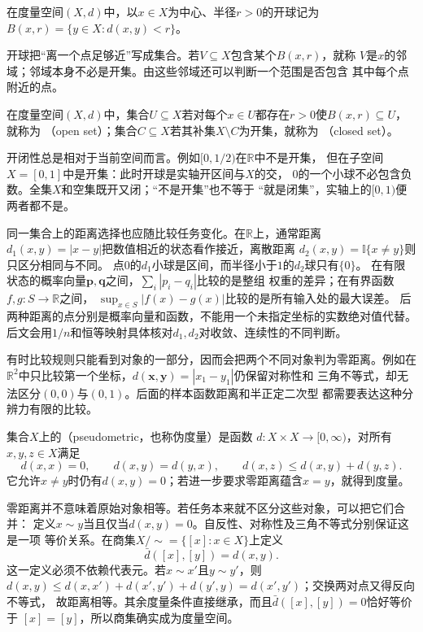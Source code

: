 \begin{definition}[开球]
\label{def:analysis-open-ball}
在度量空间$(X,d)$中，以$x\in X$为中心、半径$r>0$的开球记为
$B(x,r)=\{y\in X:d(x,y)<r\}$。
\end{definition}

开球把“离一个点足够近”写成集合。若$V\subseteq X$包含某个$B(x,r)$，就称
$V$是$x$的邻域；邻域本身不必是开集。由这些邻域还可以判断一个范围是否包含
其中每个点附近的点。

\begin{definition}[开集与闭集]
\label{def:analysis-open-closed-sets}
在度量空间$(X,d)$中，集合$U\subseteq X$若对每个$x\in U$都存在$r>0$使$B(x,r)\subseteq U$，就称为
（open set）；集合$C\subseteq X$若其补集$X\setminus C$为开集，就称为
（closed set）。
\end{definition}

开闭性总是相对于当前空间而言。例如$[0,1/2)$在$\mathbb R$中不是开集，
但在子空间$X=[0,1]$中是开集：此时开球是实轴开区间与$X$的交，
$0$的一个小球不必包含负数。全集$X$和空集既开又闭；“不是开集”也不等于
“就是闭集”，实轴上的$[0,1)$便两者都不是。

同一集合上的距离选择也应随比较任务变化。在$\mathbb R$上，通常距离
$d_1(x,y)=|x-y|$把数值相近的状态看作接近，离散距离
$d_2(x,y)=\mathbb I\{x\neq y\}$则只区分相同与不同。
点$0$的$d_1$小球是区间，而半径小于$1$的$d_2$球只有$\{0\}$。
在有限状态的概率向量$\bm p,\bm q$之间，$\sum_i|p_i-q_i|$比较的是整组
权重的差异；在有界函数$f,g:S\to\mathbb R$之间，
$\sup_{x\in S}|f(x)-g(x)|$比较的是所有输入处的最大误差。
后两种距离的点分别是概率向量和函数，不能用一个未指定坐标的实数绝对值代替。
后文会用$1/n$和恒等映射具体核对$d_1,d_2$对收敛、连续性的不同判断。

有时比较规则只能看到对象的一部分，因而会把两个不同对象判为零距离。例如在
$\mathbb R^2$中只比较第一个坐标，$d(\bm x,\bm y)=|x_1-y_1|$仍保留对称性和
三角不等式，却无法区分$(0,0)$与$(0,1)$。后面的样本函数距离和半正定二次型
都需要表达这种分辨力有限的比较。
\begin{definition}[伪距离]
\label{def:analysis-pseudometric}
集合$X$上的（pseudometric，也称伪度量）是函数
$d:X\times X\to[0,\infty)$，对所有$x,y,z\in X$满足
\[
 d(x,x)=0,\qquad d(x,y)=d(y,x),\qquad d(x,z)\leq d(x,y)+d(y,z).
\]
它允许$x\neq y$时仍有$d(x,y)=0$；若进一步要求零距离蕴含$x=y$，就得到度量。
\end{definition}
零距离并不意味着原始对象相等。若任务本来就不区分这些对象，可以把它们合并：
定义$x\sim y$当且仅当$d(x,y)=0$。自反性、对称性及三角不等式分别保证这是一项
等价关系。在商集$X/{\sim}=\{[x]:x\in X\}$上定义
\begin{equation}
 \bar d([x],[y])=d(x,y).
\label{eq:analysis-quotient-metric}
\end{equation}
这一定义必须不依赖代表元。若$x\sim x'$且$y\sim y'$，则
$d(x,y)\leq d(x,x')+d(x',y')+d(y',y)=d(x',y')$；交换两对点又得反向不等式，
故距离相等。其余度量条件直接继承，而且$\bar d([x],[y])=0$恰好等价于
$[x]=[y]$，所以商集确实成为度量空间。


